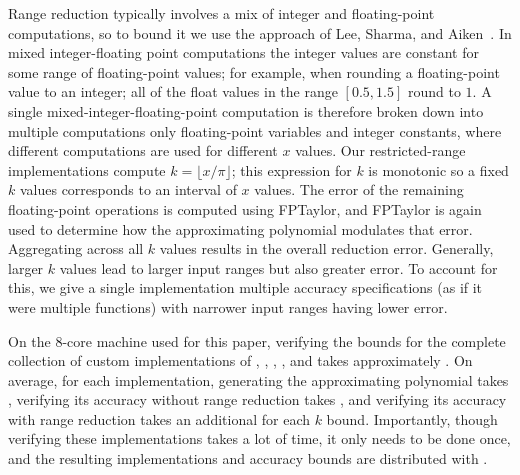 \documentclass[paper.tex]{subfiles}
\begin{document}
Range reduction typically involves a mix
  of integer and floating-point computations,
  so to bound it we use the approach of Lee, Sharma, and Aiken~\citep{verbit}.
In mixed integer-floating point computations
  the integer values are constant
  for some range of floating-point values;
  for example, when rounding a floating-point value to an integer;
  all of the float values in the range $[0.5,1.5]$ round to $1$.
A single mixed-integer-floating-point computation
  is therefore broken down into multiple computations
  only floating-point variables and integer constants,
  where different computations are used for different $x$ values.
Our restricted-range implementations
  compute $k = \lfloor x / \pi \rfloor$;
  this expression for $k$ is monotonic
  so a fixed $k$ values corresponds to an interval of $x$ values.
The error of the remaining floating-point operations
  is computed using FPTaylor,
  and FPTaylor is again used
  to determine how the approximating polynomial modulates that error.
Aggregating across all $k$ values results in the overall reduction error.
Generally, larger $k$ values lead to larger input ranges
  but also greater error.
To account for this, we give a single implementation
  multiple accuracy specifications (as if it were multiple functions)
  with narrower input ranges having lower error.

On the 8-core machine used for this paper,
  verifying the bounds for  the complete collection
  of \nOptunerImpls custom implementations
  of , , , , and 
  takes approximately \nTotalGenerationTime.
On average, for each implementation,
  generating the approximating polynomial takes \nSollyaAvg,
  verifying its accuracy without range reduction
  takes \nErrorVerrifyAvg,
  and verifying its accuracy with range reduction
  takes an additional \nReductionErrorAvg
  for each $k$ bound.
Importantly,
  though verifying these implementations takes a lot of time,
  it only needs to be done once,
  and the resulting implementations and accuracy bounds
  are distributed with \name.
\end{document}
